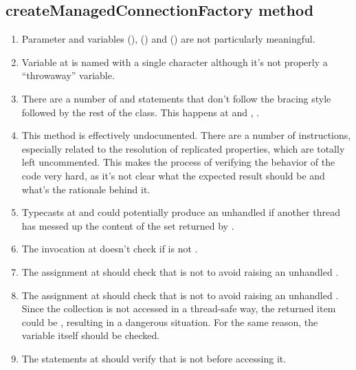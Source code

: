 \subsection{createManagedConnectionFactory method}
\begin{enumerate}
	\item {} Parameter  and variables  (),  () and  () are not particularly meaningful. 
	\item {} Variable  at  is named with a single character although it's not properly a “throwaway” variable. 
	\item {} There are a number of  and  statements that don't follow the bracing style followed by the rest of the class. This happens at  and , .
	\item {} This method is effectively undocumented. There are a number of instructions, especially related to the resolution of replicated properties, which are totally left uncommented. This makes the process of verifying the behavior of the code very hard, as it's not clear what the expected result should be and what's the rationale behind it. 
	\item {} Typecasts at  and  could potentially produce an unhandled  if another thread has messed up the content of the set returned by .
	\item {} The invocation  at  doesn't check if  is not .
	\item {} The assignment  at  should check that  is not  to avoid raising an unhandled . 
	\item {} The assignment  at  should check that  is not  to avoid raising an unhandled . Since the collection is not accessed in a thread-safe way, the returned item could be , resulting in a dangerous situation. For the same reason, the  variable itself should be checked. 
	\item {} The  statements at  should verify that  is not  before accessing it. 

\end{enumerate}

